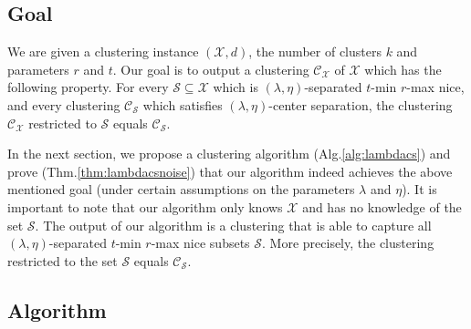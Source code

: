 \documentclass[anon,12pt]{colt2016} %
\newcommand{\mc}{\mathcal}
\begin{document}

\subsection{Goal}
We are given a clustering instance $(\mc X, d)$, the number of clusters $k$ and parameters $r$ and $t$. Our goal is to output a clustering $\mc C_{\mc X}$ of $\mc X$ which has the following property. For every $\mc S \subseteq \mc X$ which is $(\lambda, \eta)$-separated $t$-min $r$-max nice, and every clustering $\mc C_{\mc S}$ which satisfies $(\lambda, \eta)$-center separation, the clustering $\mc C_{\mc X}$ restricted to $\mc S$ equals $\mc C_{\mc S}$. 

In the next section, we propose a clustering algorithm (Alg.\ref{alg:lambdacs}) and prove (Thm.\ref{thm:lambdacsnoise}) that our algorithm indeed achieves the above mentioned goal (under certain assumptions on the parameters $\lambda$ and $\eta$). It is important to note that our algorithm only knows $\mc X$ and has no knowledge of the set $\mc S$. The output of our algorithm is a clustering that is able to capture all $(\lambda, \eta)$-separated $t$-min $r$-max nice subsets $\mc S$. More precisely, the clustering restricted to the set $\mc S$ equals $\mc C_{\mc S}$.

\subsection{Algorithm}
\end{document}
